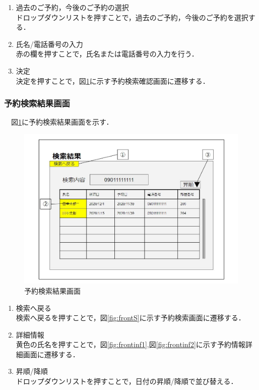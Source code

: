 \begin{enumerate}
\renewcommand{\labelenumi}{\textcircled{\scriptsize \theenumi}}
\item 過去のご予約，今後のご予約の選択\\ ドロップダウンリストを押すことで，過去のご予約，今後のご予約を選択する．
\item 氏名/電話番号の入力\\ 赤の欄を押すことで，氏名または電話番号の入力を行う．
\item 決定\\ 決定を押すことで，図\ref{fig:frontSi}に示す予約検索確認画面に遷移する．

\end{enumerate}


\subsubsection{予約検索結果画面}
　図\ref{fig:frontSi}に予約検索結果画面を示す．

\begin{figure}[H]
 \centering
   \includegraphics[width=120mm]{UI_front/searchL.jpg}
 \caption{予約検索結果画面}
 \label{fig:frontSi}
\end{figure}

\begin{enumerate}
\renewcommand{\labelenumi}{\textcircled{\scriptsize \theenumi}}
\item 検索へ戻る\\ 検索へ戻るを押すことで，図\ref{fig:frontS}に示す予約検索画面に遷移する．
\item 詳細情報\\ 黄色の氏名を押すことで，図\ref{fig:frontinf1},図\ref{fig:frontinf2}に示す予約情報詳細画面に遷移する．
\item 昇順/降順\\ ドロップダウンリストを押すことで，日付の昇順/降順で並び替える．
\end{enumerate}


